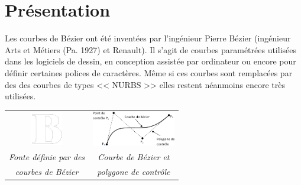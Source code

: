 \documentclass[10pt,fleqn]{article} %
\begin{document}

\vspace{1cm}
\pagestyle{fancy}
\thispagestyle{plain}

\section{Présentation}

\begin{minipage}[c]{0.5\linewidth}
Les courbes de Bézier ont été inventées par l'ingénieur Pierre Bézier (ingénieur Arts et Métiers (Pa. 1927) et Renault). Il s'agit de courbes paramétrées utilisées dans les logiciels de dessin, en conception assistée par ordinateur ou encore pour définir certaines polices de caractères. Même si ces courbes sont remplacées par des des courbes de types << NURBS >> elles restent néanmoins encore très utilisées. 
\end{minipage} \hfill
\begin{minipage}[c]{0.47\linewidth}
\begin{center}
\begin{tabular}{cc}
\includegraphics[height=1.5cm]{images/B} &
\includegraphics[height=1.5cm]{images/Courbe} \\
\textit{Fonte définie par des} & 
\textit{Courbe de Bézier et} \\
\textit{courbes de Bézier} & 
\textit{polygone de contrôle}  \\
\end{tabular}
\end{center}
\end{minipage}
\end{document}
